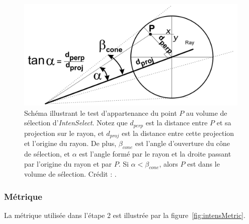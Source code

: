 	\begin{figure}[H]
		\centering
		\includegraphics[width=\textwidth]{figures/ch2/intensCone}
		\caption[\emph{IntenSelect} -- test d'appartenance au volume de sélection]{Schéma illustrant le test d'appartenance du point $P$ au volume de sélection d'\emph{IntenSelect}. Notez que $d_{perp}$ est la distance entre $P$ et sa projection sur le rayon, et $d_{proj}$ est la distance entre cette projection et l'origine du rayon. De plus, $\beta_{cone}$ est l'angle d'ouverture du cône de sélection, et $\alpha$ est l'angle formé par le rayon et la droite passant par l'origine du rayon et par $P$. Si $\alpha < \beta_{cone}$, alors $P$ est dans le volume de sélection. Crédit : \cite{de2005intenselect}.}
		\label{fig:intensCone}
	\end{figure}
	
	\subsubsection{Métrique}
	La métrique utilisée dans l'étape 2 est illustrée par la figure~\ref{fig:intensMetric}.
	
